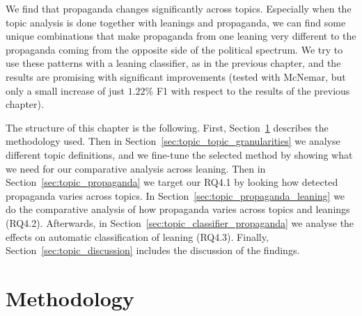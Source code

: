 We find that propaganda changes significantly across topics. Especially when the topic analysis is done together with leanings and propaganda, we can find some unique combinations that make propaganda from one leaning very different to the propaganda coming from the opposite side of the political spectrum.
We try to use these patterns with a leaning classifier, as in the previous chapter, and the results are promising with significant improvements (tested with McNemar, but only a small increase of just $1.22\%$ F1 with respect to the results of the previous chapter).

The structure of this chapter is the following. First, Section~\ref{sec:topic_method} describes the methodology used. Then in Section~\ref{sec:topic_topic_granularities} we analyse different topic definitions, and we fine-tune the selected method by showing what we need for our comparative analysis across leaning.
Then in Section~\ref{sec:topic_propaganda} we target our RQ4.1 by looking how detected propaganda varies across topics.
In Section~\ref{sec:topic_propaganda_leaning} we do the comparative analysis of how propaganda varies across topics and leanings (RQ4.2).
Afterwards, in Section~\ref{sec:topic_classifier_propaganda} we analyse the effects on automatic classification of leaning (RQ4.3).
Finally, Section~\ref{sec:topic_discussion} includes the discussion of the findings.







\section{\statusgreen Methodology}
\label{sec:topic_method}

